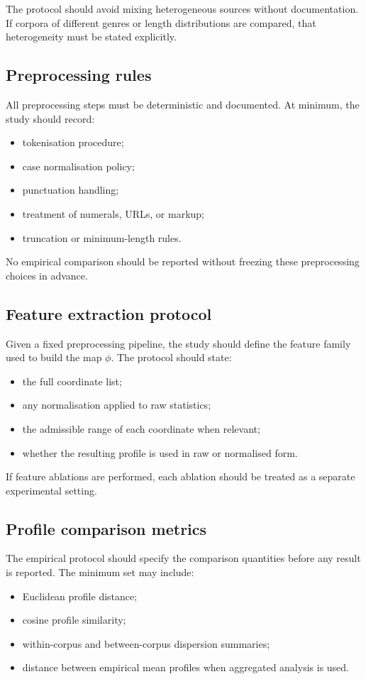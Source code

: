 \documentclass[11pt]{article}
\begin{document}
The protocol should avoid mixing heterogeneous sources without documentation. If corpora of different genres or length distributions are compared, that heterogeneity must be stated explicitly.

\subsection{Preprocessing rules}

All preprocessing steps must be deterministic and documented. At minimum, the study should record:
\begin{itemize}
    \item tokenisation procedure;
    \item case normalisation policy;
    \item punctuation handling;
    \item treatment of numerals, URLs, or markup;
    \item truncation or minimum-length rules.
\end{itemize}

No empirical comparison should be reported without freezing these preprocessing choices in advance.

\subsection{Feature extraction protocol}

Given a fixed preprocessing pipeline, the study should define the feature family used to build the map $\phi$. The protocol should state:
\begin{itemize}
    \item the full coordinate list;
    \item any normalisation applied to raw statistics;
    \item the admissible range of each coordinate when relevant;
    \item whether the resulting profile is used in raw or normalised form.
\end{itemize}

If feature ablations are performed, each ablation should be treated as a separate experimental setting.

\subsection{Profile comparison metrics}

The empirical protocol should specify the comparison quantities before any result is reported. The minimum set may include:
\begin{itemize}
    \item Euclidean profile distance;
    \item cosine profile similarity;
    \item within-corpus and between-corpus dispersion summaries;
    \item distance between empirical mean profiles when aggregated analysis is used.
\end{itemize}
\end{document}

